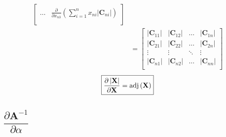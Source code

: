 \documentclass{article}
\newcommand{\adj}[1]{\ensuremath{\textnormal{adj}\left(#1\right)}} %
\newcommand\abs[1]{\left\lvert#1\right\rvert}
\begin{document}
\begin{align}
\begin{bmatrix}
        \dots & 
        \displaystyle \frac{\partial}{\partial x_{n3}} \left( \sum_{i = 1}^{n} x_{ni} \abs{\mathbf{C}_{ni}} \right) \\
    \end{bmatrix} \\
    &= \begin{bmatrix}
        \abs{\mathbf{C}_{11}} & \abs{\mathbf{C}_{12}} & \dots & \abs{\mathbf{C}_{1n}} \\
        \abs{\mathbf{C}_{21}} & \abs{\mathbf{C}_{22}} & \dots & \abs{\mathbf{C}_{2n}} \\
        \vdots & \vdots & \ddots & \vdots \\
        \abs{\mathbf{C}_{n1}} & \abs{\mathbf{C}_{n2}} & \dots & \abs{\mathbf{C}_{nn}} \\
    \end{bmatrix}
\end{align}
\begin{align}
    \boxed{\frac{\partial \abs{\mathbf{X}}}{\partial \mathbf{X}} = \adj{\mathbf{X}}}
\end{align}

\subsection{\(\dfrac{\partial \mathbf{A}^{-1}}{\partial \alpha }\)}

\nocite{*}
\printbibliography
\end{document}
